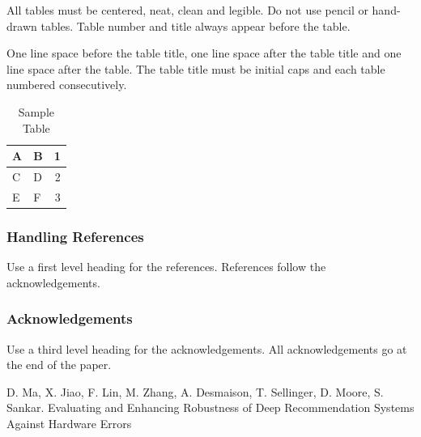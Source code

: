 \documentclass[a4paper]{article}
\begin{document}
All tables must be centered, neat, clean and legible. Do not use pencil
or hand-drawn tables. Table number and title always appear before the
table.

One line space before the table title, one line space after the table
title and one line space after the table. The table title must be
initial caps and each table numbered consecutively.

\begin{table}[ht]
\begin{center}
\caption{Sample Table}

\bigskip

\begin{tabular}{|l|l|r|}
\hline
A & B & 1\\ \hline
C & D & 2\\
E & F & 3\\ \hline
\end{tabular}
\end{center}
\end{table}


\subsubsection{Handling References}

Use a first level heading for the references. References follow the
acknowledgements.


\subsubsection{Acknowledgements}

Use a third level heading for the acknowledgements. All acknowledgements
go at the end of the paper.




% 
%

\begin{thebibliography}{Com79}
 D. Ma, X. Jiao, F. Lin, M. Zhang, A. Desmaison, T. Sellinger, D. Moore, S. Sankar.
\newblock Evaluating and Enhancing Robustness of Deep Recommendation Systems Against Hardware Errors

\end{thebibliography}
\end{document}
